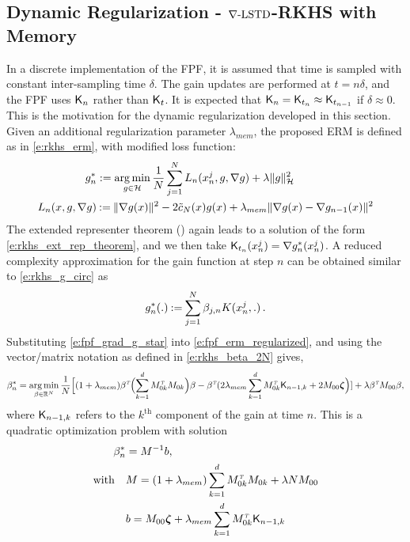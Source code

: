 \subsection{Dynamic Regularization - $\nabla\text{-LSTD}$-RKHS with Memory}
\label{s:fpf_rkhs_memory}
In a discrete implementation of the FPF, it is assumed that time is sampled with constant inter-sampling time $\delta$. The gain updates are performed at $t = n \delta$, and the FPF uses $\text{\sf K}_n$ rather than $\text{\sf K}_t$. It is expected that $\text{\sf K}_{n} = \text{\sf K}_{t_n}  \approx \text{\sf K}_{t_{n-1}}$ if $\delta\approx 0$.   This is the motivation for the dynamic regularization developed in this section.    Given an additional regularization parameter $\lambda_{mem}$,  the proposed ERM is defined as in \eqref{e:rkhs_erm},  with modified loss function:
\begin{equation}
\begin{aligned}
g^*_n & := \argmin_{g \in \clH} \frac{1}{N} \sum_{j=1}^N  L_n(x_n^j,g,\nabla g) + \lambda \|g\|^2_\clH
\\
L_n(x,g,\nabla g) &  \eqdef  \| \nabla g(x) \|^2 - 2 \tilc_N(x)g(x)  + \lambda_{mem} \|\nabla g(x) -  \nabla g_{n-1}(x)\|^2
\end{aligned}
\label{e:fpf_erm_regularized}
\end{equation}
The extended representer theorem () again leads to a solution of the form \eqref{e:rkhs_ext_rep_theorem}, and we then take
$ \text{\sf K}_{t_n}(x^j_n) = \nabla g^*_n(x^j_n)$. A reduced complexity approximation for the gain function at step $n$ can be obtained similar to \eqref{e:rkhs_g_circ} as
\begin{equation}
g^*_n(.)  \eqdef \sum_{j=1}^N \beta_{j,n} \Kern(x^j_n, . ) \, .
\label{e:fpf_grad_g_star}
\end{equation}
Substituting \eqref{e:fpf_grad_g_star} into \eqref{e:fpf_erm_regularized}, and using the vector/matrix notation as defined in \eqref{e:rkhs_beta_2N} gives,
\begin{equation}
\beta ^*_n =
\mathop{\rm arg{\,}min}_{\beta  \in \mathbb{R}^N}  \frac{1}{N} \Bigl[ (1 + \lambda_{mem}) \beta ^{\hbox{\tiny\it T}} \Bigl( \sum_{k=1}^d M_{0k}^{\hbox{\tiny\it T}} M_{0k} \Bigr) \beta  -  \beta ^{\hbox{\tiny\it T}}  ( 2 \lambda_{mem} \sum_{k=1}^d M_{0k}^{\hbox{\tiny\it T}} \text{\sf K}_{n-1,k} +2 M_{00} \boldsymbol{\zeta}  \Bigr) ] + \lambda \beta ^{\hbox{\tiny\it T}} M_{00} \beta,
\end{equation}
where $\text{\sf K}_{n-1,k}$ refers to the $k^{\text{th}}$ component of the gain at time $n$.
This is a quadratic optimization problem with solution
\begin{equation}
\begin{aligned}
\beta ^*_n  &= M^{-1} b,
\\
\text{with} \quad
&
M =  (1+ \lambda_{mem})\sum_{k=1}^d M_{0k}^\transpose M_{0k} + \lambda N M_{00}
\\
&b =  M_{00} \boldsymbol{\zeta}  + \lambda_{mem} \sum_{k =1}^d  M_{0k}^\transpose \kFPF_{n-1,k}
\end{aligned}
\label{e:fpf_beta_n}
\end{equation}

